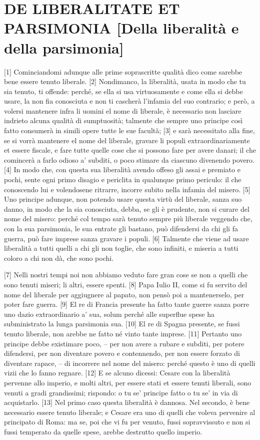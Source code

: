 \quebra\section{DE LIBERALITATE ET PARSIMONIA
{[}Della liberalità e della parsimonia{]}}

{[}1{]} Cominciandomi adunque alle prime soprascritte qualità dico come
sarebbe bene essere tenuto liberale. {[}2{]} Nondimanco, la liberalità,
usata in modo che tu sia tenuto, ti offende: perché, se ella si usa
virtuosamente e come ella si debbe usare, la non fia conosciuta e non ti
cascherà l'infamia del suo contrario; e però, a volersi mantenere infra
li uomini el nome di liberale, è necessario non lasciare indrieto alcuna
qualità di sumptuosità; talmente che sempre uno principe così fatto
consumerà in simili opere tutte le sue facultà; {[}3{]} e sarà
necessitato alla fine, se si vorrà mantenere el nome del liberale,
gravare li populi extraordinariamente et essere fiscale, e fare tutte
quelle cose che si possono fare per avere danari; il che comincerà a
farlo odioso a' subditi, o poco stimare da ciascuno divenendo povero.
{[}4{]} In modo che, con questa sua liberalità avendo offeso gli assai e
premiato e pochi, sente ogni primo disagio e periclita in qualunque
primo periculo: il che conoscendo lui e volendosene ritrarre, incorre
subito nella infamia del misero. {[}5{]} Uno principe adunque, non
potendo usare questa virtù del liberale, sanza suo danno, in modo che la
sia conosciuta, debba, se gli è prudente, non si curare del nome del
misero: perché col tempo sarà tenuto sempre più liberale veggendo che,
con la sua parsimonia, le sua entrate gli bastano, può difendersi da chi
gli fa guerra, può fare imprese sanza gravare i populi. {[}6{]} Talmente
che viene ad usare liberalità a tutti quelli a chi gli non toglie, che
sono infiniti, e miseria a tutti coloro a chi non dà, che sono pochi.

{[}7{]} Nelli nostri tempi noi non abbiamo veduto fare gran cose se non
a quelli che sono tenuti miseri; li altri, essere spenti. {[}8{]} Papa
Iulio II, come si fu servito del nome del liberale per aggiugnere al
papato, non pensò poi a mantenerselo, per poter fare guerra. {[}9{]} El
re di Francia presente ha fatto tante guerre sanza porre uno dazio
extraordinario a' sua, solum perché alle superflue spese ha
subministrato la lunga parsimonia sua. {[}10{]} El re di Spagna
presente, se fussi tenuto liberale, non arebbe ne fatto né vinto tante
imprese. {[}11{]} Pertanto uno principe debbe existimare poco, -- per
non avere a rubare e subditi, per potere difendersi, per non diventare
povero e contennendo, per non essere forzato di diventare rapace, -- di
incorrere nel nome del misero: perché questo è uno di quelli vizii che
lo fanno regnare. {[}12{]} E se alcuno dicessi: Cesare con la liberalità
pervenne allo imperio, e molti altri, per essere stati et essere tenuti
liberali, sono venuti a gradi grandissimi; rispondo: o tu se' principe
fatto o tu se' in via di acquistarlo. {[}13{]} Nel primo caso questa
liberalità è dannosa. Nel secondo, è bene necessario essere tenuto
liberale; e Cesare era uno di quelli che voleva pervenire al principato
di Roma: ma se, poi che vi fu per venuto, fussi sopravvissuto e non si
fussi temperato da quelle spese, arebbe destrutto quello imperio.

